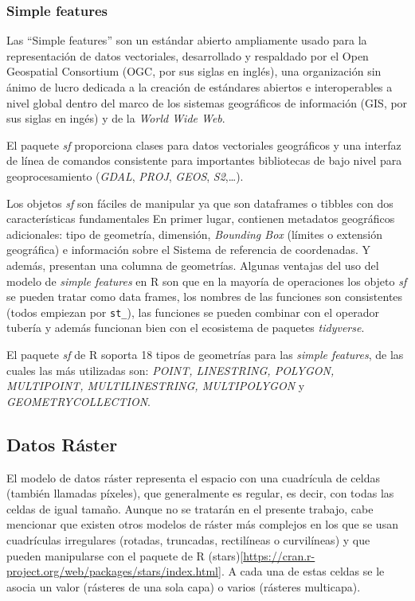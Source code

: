 \documentclass[12pt,a4paper,]{book}
\numberwithin{dummy}{section}
\theoremstyle{ocrenumbox}
\theoremstyle{blacknumex}
\theoremstyle{blacknumbox}
\theoremstyle{ocrenum}
\theoremstyle{ocrenum}
\begin{document}
\hypertarget{simple-features}{%
\subsubsection{Simple features}\label{simple-features}}

Las ``Simple features'' son un estándar abierto ampliamente usado para
la representación de datos vectoriales, desarrollado y respaldado por el
Open Geospatial Consortium (OGC, por sus siglas en inglés), una
organización sin ánimo de lucro dedicada a la creación de estándares
abiertos e interoperables a nivel global dentro del marco de los
sistemas geográficos de información (GIS, por sus siglas en ingés) y de
la \emph{World Wide Web}.

El paquete \emph{sf} proporciona clases para datos vectoriales
geográficos y una interfaz de línea de comandos consistente para
importantes bibliotecas de bajo nivel para geoprocesamiento
(\emph{GDAL}, \emph{PROJ}, \emph{GEOS}, \emph{S2},\ldots).

Los objetos \emph{sf} son fáciles de manipular ya que son dataframes o
tibbles con dos características fundamentales En primer lugar, contienen
metadatos geográficos adicionales: tipo de geometría, dimensión,
\emph{Bounding Box} (límites o extensión geográfica) e información sobre
el Sistema de referencia de coordenadas. Y además, presentan una columna
de geometrías. Algunas ventajas del uso del modelo de \emph{simple
features} en R son que en la mayoría de operaciones los objeto \emph{sf}
se pueden tratar como data frames, los nombres de las funciones son
consistentes (todos empiezan por \texttt{st\_}), las funciones se pueden
combinar con el operador tubería y además funcionan bien con el
ecosistema de paquetes \emph{tidyverse}.

El paquete \emph{sf} de R soporta 18 tipos de geometrías para las
\emph{simple features}, de las cuales las más utilizadas son:
\emph{POINT, LINESTRING, POLYGON, MULTIPOINT, MULTILINESTRING,
MULTIPOLYGON} y \emph{GEOMETRYCOLLECTION}.

\hypertarget{datos-ruxe1ster}{%
\subsection{Datos Ráster}\label{datos-ruxe1ster}}

El modelo de datos ráster representa el espacio con una cuadrícula de
celdas (también llamadas píxeles), que generalmente es regular, es
decir, con todas las celdas de igual tamaño. Aunque no se tratarán en el
presente trabajo, cabe mencionar que existen otros modelos de ráster más
complejos en los que se usan cuadrículas irregulares (rotadas,
truncadas, rectilíneas o curvilíneas) y que pueden manipularse con el
paquete de R
(stars){[}\url{https://cran.r-project.org/web/packages/stars/index.html}{]}.
A cada una de estas celdas se le asocia un valor (rásteres de una sola
capa) o varios (rásteres multicapa).
\end{document}
